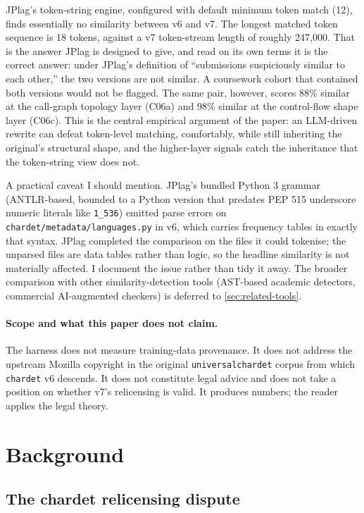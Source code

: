 \documentclass[11pt,letterpaper]{article}
\begin{document}
JPlag's token-string engine, configured with default minimum token
match (12), finds essentially no similarity between v6 and v7. The
longest matched token sequence is 18 tokens, against a v7
token-stream length of roughly 247{,}000. That is the answer JPlag is
designed to give, and read on its own terms it is the correct
answer: under JPlag's definition of ``submissions suspiciously
similar to each other,'' the two versions are not similar. A
coursework cohort that contained both versions would not be flagged.
The same pair, however, scores 88\% similar at the call-graph
topology layer (C06a) and 98\% similar at the control-flow shape
layer (C06c). This is the central empirical argument of the paper:
an LLM-driven rewrite can defeat token-level matching, comfortably,
while still inheriting the original's structural shape, and the
higher-layer signals catch the inheritance that the token-string
view does not.

A practical caveat I should mention. JPlag's bundled Python 3 grammar
(ANTLR-based, bounded to a Python version that predates PEP 515
underscore numeric literals like \texttt{1\_536}) emitted parse errors
on \texttt{chardet/metadata/languages.py} in v6, which carries
frequency tables in exactly that syntax. JPlag completed the
comparison on the files it could tokenise; the unparsed files are
data tables rather than logic, so the headline similarity is not
materially affected. I document the issue rather than tidy it away.
The broader comparison with other similarity-detection tools
(AST-based academic detectors, commercial AI-augmented checkers) is
deferred to \cref{sec:related-tools}.

\paragraph{Scope and what this paper does not claim.}
The harness does not measure training-data provenance. It does not
address the upstream Mozilla copyright in the original
\texttt{universalchardet} corpus from which \texttt{chardet} v6
descends. It does not constitute legal advice and does not take a
position on whether v7's relicensing is valid. It produces numbers; the
reader applies the legal theory.

\section{Background}
\label{sec:background}

\subsection{The chardet relicensing dispute}
\label{sec:dispute}
\end{document}
